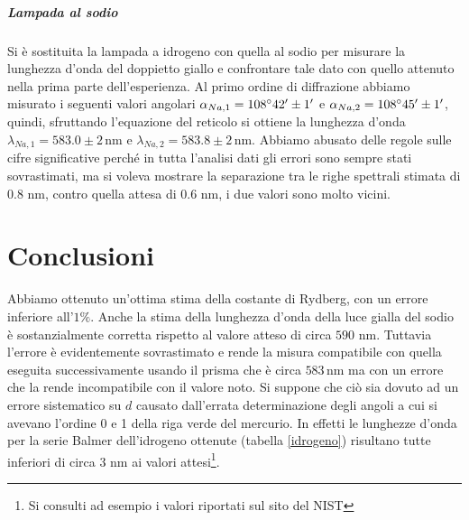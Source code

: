 \documentclass[10pt,a4paper]{article}
\begin{document}
\subparagraph{Lampada al sodio}
Si è sostituita la lampada a idrogeno con quella al sodio per misurare la lunghezza d'onda del doppietto giallo e confrontare tale dato con quello attenuto nella prima parte dell'esperienza. Al primo ordine di diffrazione abbiamo misurato i seguenti valori angolari $\alpha_{Na,1}= 108\degree 42'\pm 1' $ e $\alpha_{Na,2}=108\degree 45' \pm 1'$, quindi, sfruttando l'equazione del reticolo si ottiene la lunghezza d'onda $\lambda_{Na,1}=583.0 \pm 2 \,\mbox{nm}$ e $\lambda_{Na,2}=583.8 \pm 2 \,\mbox{nm}$.
Abbiamo abusato delle regole sulle cifre significative perché in tutta l'analisi dati gli errori sono sempre stati sovrastimati, ma si voleva mostrare la separazione tra le righe spettrali stimata di $0.8 \, \,\mbox{nm}$, contro quella attesa di $0.6 \, \,\mbox{nm}$, i due valori sono molto vicini.\\

\section{Conclusioni}
Abbiamo ottenuto un'ottima stima della costante di Rydberg, con un errore inferiore all'$1\%$. Anche la stima della lunghezza d'onda della luce gialla del sodio è sostanzialmente corretta rispetto al valore atteso di circa $590 \, \,\mbox{nm}$. Tuttavia l'errore è evidentemente sovrastimato e rende la misura  compatibile con quella eseguita successivamente usando il prisma che è circa $583\,\mbox{nm}$ ma con un errore che la rende incompatibile con il valore noto. Si suppone che ciò sia dovuto ad un errore sistematico su $d$ causato dall'errata determinazione degli angoli a cui si avevano l'ordine 0 e 1 della riga verde del mercurio. In effetti le lunghezze d'onda per la serie Balmer dell'idrogeno ottenute (tabella \ref{idrogeno}) risultano tutte inferiori di circa 3 nm ai valori attesi\footnote{Si consulti ad esempio i valori riportati sul sito del NIST}.\\
\end{document}
